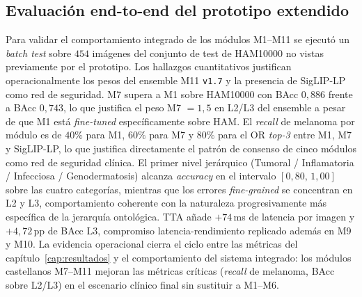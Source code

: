 \subsection{Evaluación end-to-end del prototipo extendido}
\label{sec:dermapixel-batch-test}

Para validar el comportamiento integrado de los módulos M1--M11
se ejecutó un \emph{batch test} sobre $454$ imágenes del
conjunto de test de HAM10000 no vistas previamente por el
prototipo. Los hallazgos cuantitativos justifican operacionalmente
los pesos del ensemble M11 \texttt{v1.7} y la presencia de
SigLIP-LP como red de seguridad. M7 supera a M1 sobre HAM10000
con BAcc $0{,}886$ frente a BAcc $0{,}743$, lo que justifica el
peso M7 $= 1{,}5$ en L2/L3 del ensemble a pesar de que M1 está
\emph{fine-tuned} específicamente sobre HAM. El \emph{recall} de
melanoma por módulo es de $40\%$ para M1, $60\%$ para M7 y
$80\%$ para el OR \emph{top-3} entre M1, M7 y SigLIP-LP, lo que
justifica directamente el patrón de consenso de cinco módulos
como red de seguridad clínica. El primer nivel jerárquico
(Tumoral / Inflamatoria / Infecciosa / Genodermatosis) alcanza
\emph{accuracy} en el intervalo $[0{,}80,\,1{,}00]$ sobre las
cuatro categorías, mientras que los errores \emph{fine-grained}
se concentran en L2 y L3, comportamiento coherente con la
naturaleza progresivamente más específica de la jerarquía
ontológica. TTA añade $+74$\,ms de latencia por imagen y
$+4{,}72$\,pp de BAcc L3, compromiso latencia-rendimiento
replicado además en M9 y M10. La evidencia operacional cierra
el ciclo entre las métricas del capítulo~\ref{cap:resultados} y
el comportamiento del sistema integrado: los módulos castellanos
M7--M11 mejoran las métricas críticas (\emph{recall} de melanoma,
BAcc sobre L2/L3) en el escenario clínico final sin sustituir
a M1--M6.
